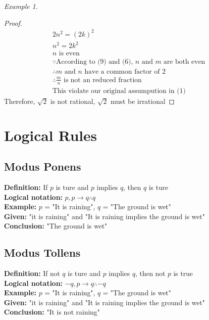 \documentclass[11pt]{article}
\theoremstyle{remark}
\newtheorem*{example}{Example}
\begin{document}
\begin{example}
\begin{proof}
\begin{gather}
			2n^2 = (2k)^2 \\
			n^2 = 2k^2 \\
			\text{$n$ is even}\\
			\because \text{According to (9) and (6), $n$ and $m$ are both even} \\
			\therefore \text{$m$ and $n$ have a common factor of 2} \\
			\therefore \text{$\frac{m}{n}$ is not an reduced fraction}\\
			\text{This violate our original assumpution in (1)}
		\end{gather}
		Therefore, $\sqrt{2}$ is not rational, $\sqrt{2}$ must be irrational
	\end{proof}
	\end{example}

	\section{Logical Rules}
	\subsection{Modus Ponens}
	\begin{center}

		\textbf{Definition: }If $p$ is ture and $p$ implies $q$, then $q$ is ture \\
		\textbf{Logical notation: } $p, p\to q\therefore q$ \\
		\textbf{Example: }$p$ = "It is raining", $q$ = "The ground is wet"\\
		\textbf{Given: }"it is raining" and "It is raining implies the ground is wet"\\
		\textbf{Conclusion: }"The ground is wet"\\
		
	\end{center}

	\subsection{Modus Tollens}
	\begin{center}
		\textbf{Definition: }If not $q$ is ture and $p$ implies $q$, then not $p$ is true \\
		\textbf{Logical notation: } $-q, p \to q \therefore -q$ \\
		\textbf{Example: } $p$ = "It is raining", $q$ = "The ground is wet"\\
		\textbf{Given: } "it is raining" and "It is raining implies the ground is wet"\\
		\textbf{Conclusion: } "It is not raining"\\
	\end{center}
\end{document}
